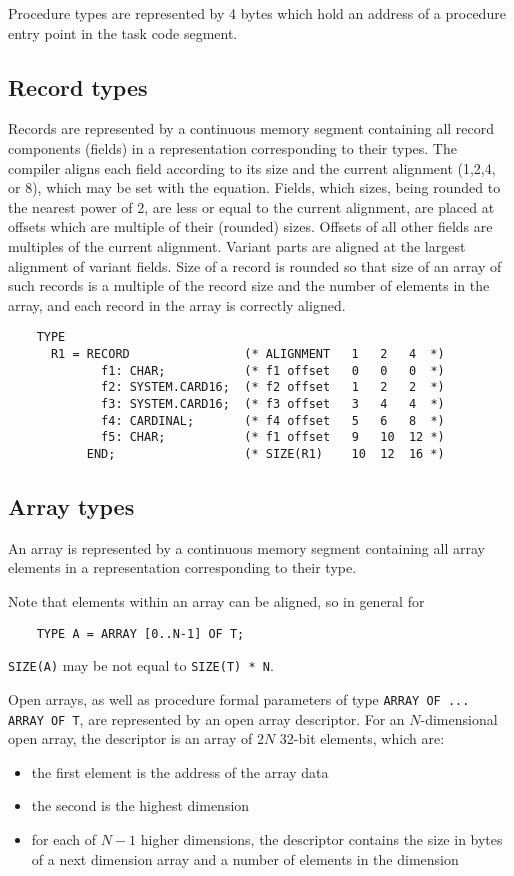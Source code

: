 Procedure types are represented by 4 bytes which hold
an address of a procedure entry point in the task code segment.

\subsection{Record types}\label{lowlevel:recrep}

Records are represented by a continuous memory segment containing all
record components (fields) in a representation corresponding to their
types. The compiler aligns each field according to its size and the
current alignment (1,2,4, or 8), which may be set with the 
equation. Fields, which sizes, being rounded to the nearest power of 2,
are less or equal to the current alignment, are placed at offsets which are
multiple of their (rounded) sizes. Offsets of all other fields
are multiples of the current alignment. Variant parts are aligned at the
largest alignment of variant fields. Size of a record is rounded so that
size of an array of such records is a multiple of the record size and
the number of elements in the array, and each record in the array is
correctly aligned.

\begin{verbatim}
    TYPE
      R1 = RECORD                (* ALIGNMENT   1   2   4  *)
             f1: CHAR;           (* f1 offset   0   0   0  *)
             f2: SYSTEM.CARD16;  (* f2 offset   1   2   2  *)
             f3: SYSTEM.CARD16;  (* f3 offset   3   4   4  *)
             f4: CARDINAL;       (* f4 offset   5   6   8  *)
             f5: CHAR;           (* f1 offset   9   10  12 *)
           END;                  (* SIZE(R1)    10  12  16 *)
\end{verbatim}


\subsection{Array types}\label{lowlevel:opendesc}

An array is represented by a continuous memory segment containing all
array elements in a representation corresponding to their type.

Note that elements within an array can be aligned, so in general  %
for

\verb'    TYPE A = ARRAY [0..N-1] OF T;'

{\tt SIZE(A)} may be not equal to {\tt SIZE(T) * N}.

Open arrays, as well as procedure formal parameters of type
{\tt ARRAY OF ... ARRAY OF T}, are represented by an open array descriptor.
For an $N$-dimensional open array, the descriptor is an array of $2N$
32-bit elements, which are:
\begin{itemize}
\item   the first element is the address of the array data
\item   the second is the highest dimension
\item   for each of $N-1$ higher dimensions, the descriptor contains
        the size in bytes of a next dimension array and a number of elements
        in the dimension
\end{itemize}

